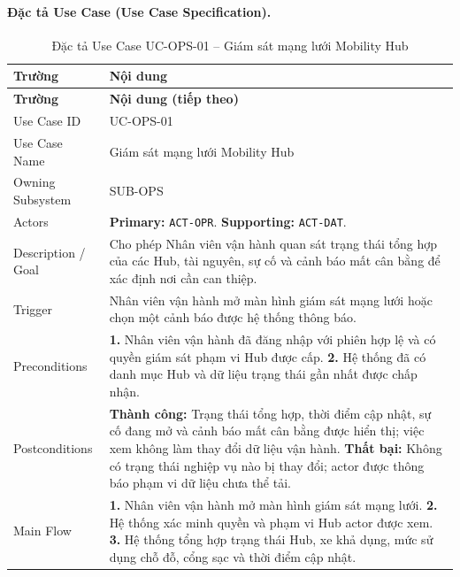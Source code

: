 \paragraph{Đặc tả Use Case (Use Case Specification).}
\small
\begin{longtable}{|L{42mm}|L{102mm}|}
  \caption{Đặc tả Use Case UC-OPS-01 -- Giám sát mạng lưới Mobility Hub}\label{tab:spec-UC-OPS-01}\\
  \hline
  \centering\arraybackslash\textbf{Trường} & \centering\arraybackslash\textbf{Nội dung}\\
  \hline
  \endfirsthead
  \hline
  \centering\arraybackslash\textbf{Trường} & \centering\arraybackslash\textbf{Nội dung (tiếp theo)}\\
  \hline
  \endhead
  Use Case ID & UC-OPS-01\\\hline
  Use Case Name & Giám sát mạng lưới Mobility Hub\\\hline
  Owning Subsystem & SUB-OPS\\\hline
  Actors & \textbf{Primary:} \texttt{ACT-OPR}. \textbf{Supporting:} \texttt{ACT-DAT}.\\\hline
  Description / Goal & Cho phép Nhân viên vận hành quan sát trạng thái tổng hợp của các Hub, tài nguyên, sự cố và cảnh báo mất cân bằng để xác định nơi cần can thiệp.\\\hline
  Trigger & Nhân viên vận hành mở màn hình giám sát mạng lưới hoặc chọn một cảnh báo được hệ thống thông báo.\\\hline
  Preconditions &
    \textbf{1.} Nhân viên vận hành đã đăng nhập với phiên hợp lệ và có quyền giám sát phạm vi Hub được cấp.\newline
    \textbf{2.} Hệ thống đã có danh mục Hub và dữ liệu trạng thái gần nhất được chấp nhận.\\\hline
  Postconditions &
    \textbf{Thành công:} Trạng thái tổng hợp, thời điểm cập nhật, sự cố đang mở và cảnh báo mất cân bằng được hiển thị; việc xem không làm thay đổi dữ liệu vận hành.\newline
    \textbf{Thất bại:} Không có trạng thái nghiệp vụ nào bị thay đổi; actor được thông báo phạm vi dữ liệu chưa thể tải.\\\hline
  Main Flow &
    \textbf{1.} Nhân viên vận hành mở màn hình giám sát mạng lưới.\newline
    \textbf{2.} Hệ thống xác minh quyền và phạm vi Hub actor được xem.\newline
    \textbf{3.} Hệ thống tổng hợp trạng thái Hub, xe khả dụng, mức sử dụng chỗ đỗ, cổng sạc và thời điểm cập nhật.\newline

\end{longtable}
